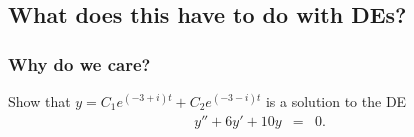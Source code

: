 \subsection{What does this have to do with DEs?}

\begin{frame}
  \frametitle{Why do we care?}

  Show that $y=C_1 e^{(-3+i)t} + C_2 e^{(-3-i)t}$ is a solution to the DE
  \begin{eqnarray*}
    y'' + 6y' + 10y & = & 0.
  \end{eqnarray*}

\end{frame}




